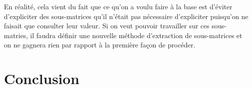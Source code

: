 \documentclass[a4paper,11pt]{article}
\begin{document}
En réalité, cela vient du fait que ce qu'on a voulu faire à la base est d'éviter d'expliciter des sous-matrices qu'il n'était pas nécessaire d'expliciter puisqu'on ne faisait que consulter leur valeur. Si on veut pouvoir travailler sur ces sous-matries, il faudra définir une nouvelle méthode d'extraction de sous-matrices et on ne gagnera rien par rapport à la première façon de procéder.

\section*{Conclusion}
\end{document}
